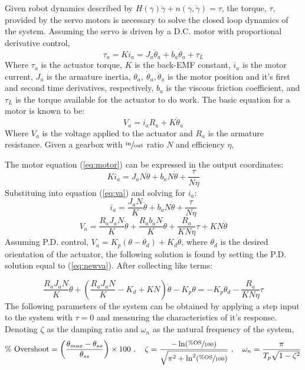 \documentclass[12pt]{report}
\begin{document}
\newpage
Given robot dynamics described by \(H(\gamma)\ddot{\gamma} + n(\gamma,\dot{\gamma}) = \tau\), the torque, $\tau$, provided by the servo motors is necessary to solve the closed loop dynamics of the system. Assuming the servo is driven by a D.C. motor with proportional derivative control,
\begin{equation}
  \tau_a = Ki_a = J_a\ddot{\theta}_a + b_a\dot{\theta}_a + \tau_L
  \label{eq:motor}
\end{equation}
Where $\tau_a$ is the actuator torque, $K$ is the back-EMF constant, $i_a$ is the motor current, $J_a$ is the armature inertia, $\theta_a,~\dot{\theta}_a,\ddot{\theta}_a$ is the motor position and it's first and second time derivatives, respectively, $b_a$ is the viscous friction coefficient, and $\tau_L$ is the torque available for the actuator to do work. The basic equation for a motor is known to be:
\begin{equation}
  V_a = i_aR_a + K\dot{\theta}_a
  \label{eq:va}
\end{equation}
Where $V_a$ is the voltage applied to the actuator and $R_a$ is the armature resistance. Given a gearbox with $\sfrac{\text{in}}{\text{out}}$ ratio $N$ and efficiency $\eta$,

The motor equation (\ref{eq:motor}) can be expressed in the output coordinates:
\[
Ki_a = J_aN\ddot{\theta} + b_aN\dot{\theta} + \frac{\tau}{N\eta}
\]
Substituing into equation (\ref{eq:va}) and solving for $i_a$:
\[
  i_a = \frac{J_aN}{K}\ddot{\theta} + b_aN\dot{\theta} + \frac{\tau}{N\eta}
\]
\begin{equation}
  V_a = \frac{R_aJ_aN}{K}\ddot{\theta} + \frac{R_ab_aN}{K}\dot{\theta} + \frac{R_a}{KN\eta}\tau + KN\dot{\theta}
  \label{eq:newva}
\end{equation}
Assuming P.D. control, \(V_a = K_p(\theta-\theta_d) + K_d\dot{\theta}\), where $\theta_d$ is the desired orientation of the actuator, the following solution is found by setting the P.D. solution equal to (\ref{eq:newva}). After collecting like terms:

\begin{equation}
  \frac{R_aJ_aN}{K}\ddot{\theta} + \left( \frac{R_aJ_aN}{K} - K_d + KN \right)\dot{\theta} - K_p\theta = -K_p\theta_d - \frac{R_a}{KN\eta}\tau
  \label{eq:end1}
\end{equation}
\newpage
The following parameters of the system can be obtained by applying a step input to the system with $\tau=0$ and measuring the characteristics of it's response. Denoting $\zeta$ as the damping ratio and $\omega_n$ as the natural frequency of the system,
\[
  \text{\% Overshoot} = \left( \frac{\theta_{max} - \theta_{ss}}{\theta_{ss}} \right) \times 100~,\quad \zeta = \frac{-\ln(\sfrac{\%\text{OS}}{100})}{\sqrt{\pi^2 + \ln^2(\sfrac{\%\text{OS}}{100})}}~,\quad \omega_n = \frac{\pi}{T_p\sqrt{1-\zeta^2}}
\]
\end{document}
